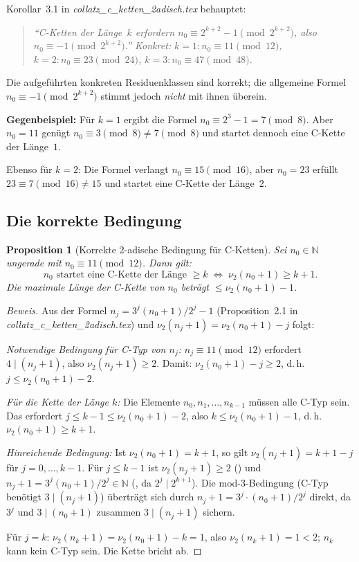 \documentclass[12pt,a4paper]{article}
\newtheorem{proposition}[definition]{Proposition}
\newenvironment{beweis}{\begin{proof}[Beweis]}{\end{proof}}
\newcommand{\vii}{\nu_2}
\newcommand{\N}{\mathbb{N}}
\begin{document}
Korollar~3.1 in \textit{collatz\_c\_ketten\_2adisch.tex} behauptet:
\begin{quote}
\emph{``C-Ketten der Länge~$k$ erfordern $n_0 \equiv 2^{k+2}-1 \pmod{2^{k+2}}$,
also $n_0 \equiv -1 \pmod{2^{k+2}}$.''
Konkret: $k=1\colon n_0 \equiv 11 \pmod{12}$,\; $k=2\colon n_0 \equiv 23 \pmod{24}$,\; $k=3\colon n_0 \equiv 47 \pmod{48}$.}
\end{quote}
Die aufgeführten konkreten Residuenklassen sind korrekt; die allgemeine Formel
$n_0 \equiv -1 \pmod{2^{k+2}}$ stimmt jedoch \emph{nicht} mit ihnen überein.

\begin{tcolorbox}[korrektur]
\textbf{Gegenbeispiel:} Für $k=1$ ergibt die Formel $n_0 \equiv 2^3-1 = 7 \pmod{8}$.
Aber $n_0 = 11$ genügt $n_0 \equiv 3 \pmod{8} \neq 7 \pmod{8}$ und startet
dennoch eine C-Kette der Länge~$1$.

Ebenso für $k=2$: Die Formel verlangt $n_0 \equiv 15 \pmod{16}$, aber $n_0 = 23$
erfüllt $23 \equiv 7 \pmod{16} \neq 15$ und startet eine C-Kette der Länge~$2$.
\end{tcolorbox}

\subsection{Die korrekte Bedingung}

\begin{proposition}[Korrekte 2-adische Bedingung für C-Ketten]
\label{prop:korrekt}
Sei $n_0 \in \N$ ungerade mit $n_0 \equiv 11 \pmod{12}$. Dann gilt:
\[
  \text{$n_0$ startet eine C-Kette der Länge $\geq k$}
  \;\Longleftrightarrow\;
  \vii(n_0+1) \geq k+1.
\]
Die maximale Länge der C-Kette von $n_0$ beträgt $\leq \vii(n_0+1) - 1$.
\end{proposition}

\begin{beweis}
Aus der Formel $n_j = 3^j(n_0+1)/2^j - 1$ (Proposition~2.1 in
\textit{collatz\_c\_ketten\_2adisch.tex}) und $\vii(n_j+1) = \vii(n_0+1) - j$
folgt:

\textit{Notwendige Bedingung für C-Typ von $n_j$:} $n_j \equiv 11 \pmod{12}$
erfordert $4 \mid (n_j+1)$, also $\vii(n_j+1) \geq 2$.
Damit: $\vii(n_0+1) - j \geq 2$, d.\,h.\ $j \leq \vii(n_0+1) - 2$.

\textit{Für die Kette der Länge $k$:} Die Elemente $n_0, n_1, \ldots, n_{k-1}$
müssen alle C-Typ sein. Das erfordert $j \leq k-1 \leq \vii(n_0+1) - 2$,
also $k \leq \vii(n_0+1) - 1$, d.\,h.\ $\vii(n_0+1) \geq k+1$.

\textit{Hinreichende Bedingung:} Ist $\vii(n_0+1) = k+1$, so gilt
$\vii(n_j+1) = k+1 - j$ für $j = 0, \ldots, k-1$.
Für $j \leq k-1$ ist $\vii(n_j+1) \geq 2$ (\checkmark) und
$n_j+1 = 3^j(n_0+1)/2^j \in \N$ (\checkmark, da $2^j \mid 2^{k+1}$).
Die mod-3-Bedingung (C-Typ benötigt $3 \mid (n_j+1)$) überträgt sich durch
$n_j+1 = 3^j \cdot (n_0+1)/2^j$ direkt, da $3^j$ und $3 \mid (n_0+1)$
zusammen $3 \mid (n_j+1)$ sichern.

Für $j = k$: $\vii(n_k+1) = \vii(n_0+1) - k = 1$, also $\vii(n_k+1) = 1 < 2$;
$n_k$ kann kein C-Typ sein. Die Kette bricht ab. \qedhere
\end{beweis}
\end{document}
